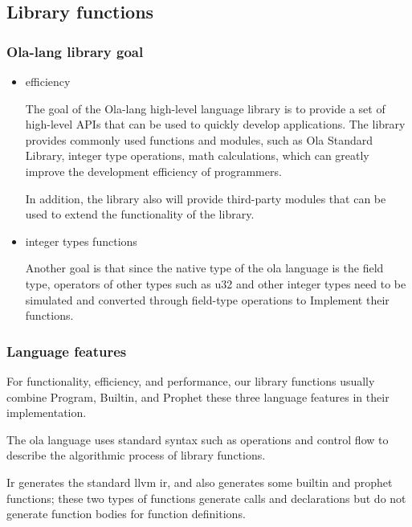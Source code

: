 \subsection{Library functions}

\subsubsection{Ola-lang library goal}

\begin{itemize}
    \item efficiency

    The goal of the Ola-lang high-level language library is to provide a set of high-level APIs that can be used to quickly develop applications.
The library provides commonly used functions and modules, such as Ola Standard Library, integer type operations, math calculations,
which can greatly improve the development efficiency of programmers.

    In addition, the library also will provide third-party modules that can be used to extend the functionality of the library.
    \item  integer types functions

    Another goal is that since the native type of the ola language is the field type,
operators of other types such as u32 and other integer types need to be simulated and converted through field-type operations to Implement their functions.
\end{itemize}

\subsubsection{Language features}
    For functionality, efficiency, and performance, our library functions usually combine Program, Builtin, and Prophet these three language features in their implementation.

    The ola language uses standard syntax such as operations and control flow to describe the algorithmic process of library functions.

    Ir generates the standard llvm ir, and also generates some builtin and prophet functions; these two types of functions generate calls and declarations but do not generate function bodies for function definitions.

